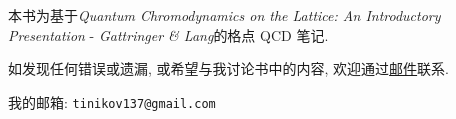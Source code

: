 
\begin{spacing}{1.8}
  本书为基于\textit{Quantum Chromodynamics on the Lattice: An Introductory Presentation} - \textit{Gattringer \& Lang}的格点 QCD 笔记.

  如发现任何错误或遗漏, 或希望与我讨论书中的内容, 欢迎通过\href{mailto:tinikov137@gmail.com}{邮件}联系.

  我的邮箱: \texttt{tinikov137@gmail.com}
\end{spacing}
\pagestyle{general}